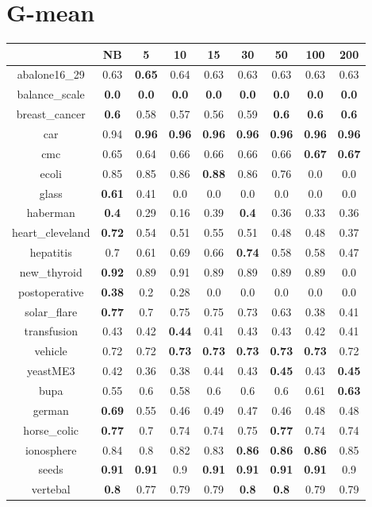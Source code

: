 \documentclass{article}%
\begin{document}
%
\section*{G{-}mean}%
\begin{tabular}{c|cccccccc}%
\hline%
&NB&5&10&15&30&50&100&200\\%
\hline%
abalone16\_29&0.63&\textbf{0.65}&0.64&0.63&0.63&0.63&0.63&0.63\\%
\hline%
balance\_scale&\textbf{0.0}&\textbf{0.0}&\textbf{0.0}&\textbf{0.0}&\textbf{0.0}&\textbf{0.0}&\textbf{0.0}&\textbf{0.0}\\%
\hline%
breast\_cancer&\textbf{0.6}&0.58&0.57&0.56&0.59&\textbf{0.6}&\textbf{0.6}&\textbf{0.6}\\%
\hline%
car&0.94&\textbf{0.96}&\textbf{0.96}&\textbf{0.96}&\textbf{0.96}&\textbf{0.96}&\textbf{0.96}&\textbf{0.96}\\%
\hline%
cmc&0.65&0.64&0.66&0.66&0.66&0.66&\textbf{0.67}&\textbf{0.67}\\%
\hline%
ecoli&0.85&0.85&0.86&\textbf{0.88}&0.86&0.76&0.0&0.0\\%
\hline%
glass&\textbf{0.61}&0.41&0.0&0.0&0.0&0.0&0.0&0.0\\%
\hline%
haberman&\textbf{0.4}&0.29&0.16&0.39&\textbf{0.4}&0.36&0.33&0.36\\%
\hline%
heart\_cleveland&\textbf{0.72}&0.54&0.51&0.55&0.51&0.48&0.48&0.37\\%
\hline%
hepatitis&0.7&0.61&0.69&0.66&\textbf{0.74}&0.58&0.58&0.47\\%
\hline%
new\_thyroid&\textbf{0.92}&0.89&0.91&0.89&0.89&0.89&0.89&0.0\\%
\hline%
postoperative&\textbf{0.38}&0.2&0.28&0.0&0.0&0.0&0.0&0.0\\%
\hline%
solar\_flare&\textbf{0.77}&0.7&0.75&0.75&0.73&0.63&0.38&0.41\\%
\hline%
transfusion&0.43&0.42&\textbf{0.44}&0.41&0.43&0.43&0.42&0.41\\%
\hline%
vehicle&0.72&0.72&\textbf{0.73}&\textbf{0.73}&\textbf{0.73}&\textbf{0.73}&\textbf{0.73}&0.72\\%
\hline%
yeastME3&0.42&0.36&0.38&0.44&0.43&\textbf{0.45}&0.43&\textbf{0.45}\\%
\hline%
bupa&0.55&0.6&0.58&0.6&0.6&0.6&0.61&\textbf{0.63}\\%
\hline%
german&\textbf{0.69}&0.55&0.46&0.49&0.47&0.46&0.48&0.48\\%
\hline%
horse\_colic&\textbf{0.77}&0.7&0.74&0.74&0.75&\textbf{0.77}&0.74&0.74\\%
\hline%
ionosphere&0.84&0.8&0.82&0.83&\textbf{0.86}&\textbf{0.86}&\textbf{0.86}&0.85\\%
\hline%
seeds&\textbf{0.91}&\textbf{0.91}&0.9&\textbf{0.91}&\textbf{0.91}&\textbf{0.91}&\textbf{0.91}&0.9\\%
\hline%
vertebal&\textbf{0.8}&0.77&0.79&0.79&\textbf{0.8}&\textbf{0.8}&0.79&0.79\\%
\hline%
\end{tabular}

%
\end{document}
